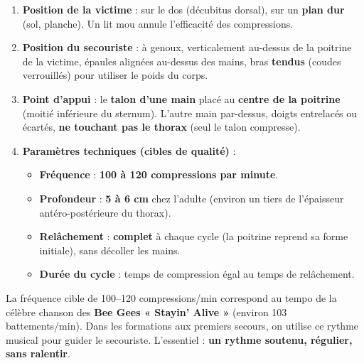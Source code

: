 \documentclass[11pt]{article}
\begin{document}
\begin{definition}
\begin{enumerate}
    \item \textbf{Position de la victime} : sur le dos (décubitus dorsal), sur un \textbf{plan dur} (sol, planche). Un lit mou annule l'efficacité des compressions.
    \item \textbf{Position du secouriste} : à genoux, verticalement au-dessus de la poitrine de la victime, épaules alignées au-dessus des mains, bras \textbf{tendus} (coudes verrouillés) pour utiliser le poids du corps.
    \item \textbf{Point d'appui} : le \textbf{talon d'une main} placé au \textbf{centre de la poitrine} (moitié inférieure du sternum). L'autre main par-dessus, doigts entrelacés ou écartés, \textbf{ne touchant pas le thorax} (seul le talon compresse).
    \item \textbf{Paramètres techniques (cibles de qualité)} :
    \begin{itemize}
        \item \textbf{Fréquence} : \textbf{100 à 120 compressions par minute}.
        \item \textbf{Profondeur} : \textbf{5 à 6 cm} chez l'adulte (environ un tiers de l'épaisseur antéro-postérieure du thorax).
        \item \textbf{Relâchement} : \textbf{complet} à chaque cycle (la poitrine reprend sa forme initiale), sans décoller les mains.
        \item \textbf{Durée du cycle} : temps de compression égal au temps de relâchement.
    \end{itemize}
\end{enumerate}
\end{definition}

\begin{exemplebox}
La fréquence cible de 100--120 compressions/min correspond au tempo de la célèbre chanson des \textbf{Bee Gees « Stayin' Alive »} (environ 103 battements/min). Dans les formations aux premiers secours, on utilise ce rythme musical pour guider le secouriste. L'essentiel : \textbf{un rythme soutenu, régulier, sans ralentir}.
\end{exemplebox}
\end{document}
